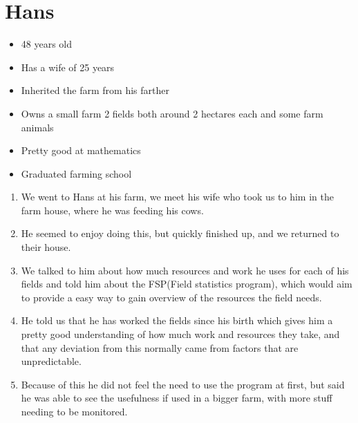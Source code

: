 \section{Hans}
\begin{itemize}[noitemsep]
    \item 48 years old 
    \item Has a wife of 25 years 
    \item Inherited the farm from his farther 
    \item Owns a small farm 2 fields both around 2 hectares each and some farm animals
    \item Pretty good at mathematics
    \item Graduated farming school
\end{itemize}

\begin{enumerate}
    \item We went to Hans at his farm, we meet his wife who took us to him in the farm house, where he was feeding his cows.
    \item He seemed to enjoy doing this, but quickly finished up, and we returned to their house.
    \item  We talked to him about how much resources and work he uses for each of his fields and told him about the FSP(Field statistics program), which would aim to provide a easy way to gain overview of the resources the field needs.
    \item He told us that he has worked the fields since his birth which gives him a pretty good understanding of how much work and resources they take, and that any deviation from this normally came from factors that are unpredictable.
    \item  Because of this he did not feel the need to use the program at first, but said he was able to see the usefulness if used in a bigger farm, with more stuff needing to be monitored.
\end{enumerate}

